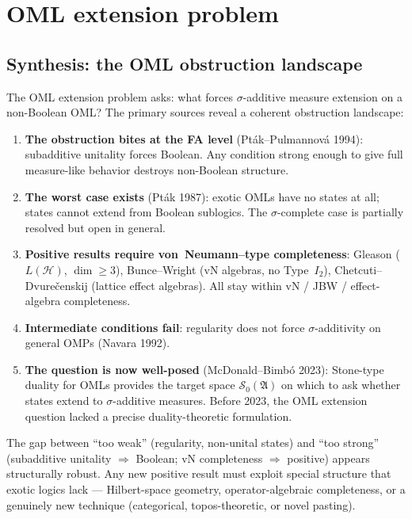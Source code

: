 \section{OML extension problem}

\subsection*{Synthesis: the OML obstruction landscape}

The OML extension problem asks: what forces $\sigma$-additive measure
extension on a non-Boolean OML?  The primary sources reveal a coherent
obstruction landscape:

\begin{enumerate}[nosep]
  \item \textbf{The obstruction bites at the FA level} (Pt\'{a}k--Pulmannov\'{a}
    1994): subadditive unitality forces Boolean.  Any condition strong
    enough to give full measure-like behavior destroys non-Boolean
    structure.
  \item \textbf{The worst case exists} (Pt\'{a}k 1987): exotic OMLs have
    no states at all; states cannot extend from Boolean sublogics.
    The $\sigma$-complete case is partially resolved but open in general.
  \item \textbf{Positive results require von~Neumann--type completeness}:
    Gleason ($L(\mathcal{H})$, $\dim \geq 3$), Bunce--Wright (vN
    algebras, no Type~$I_2$), Chetcuti--Dvure\v{c}enskij (lattice effect
    algebras).  All stay within vN / JBW / effect-algebra completeness.
  \item \textbf{Intermediate conditions fail}: regularity does not force
    $\sigma$-additivity on general OMPs (Navara 1992).
  \item \textbf{The question is now well-posed} (McDonald--Bimb\'{o} 2023):
    Stone-type duality for OMLs provides the target space
    $\mathcal{S}_0(\mathfrak{A})$ on which to ask whether states extend
    to $\sigma$-additive measures.  Before 2023, the OML extension
    question lacked a precise duality-theoretic formulation.
\end{enumerate}

\noindent
The gap between ``too weak'' (regularity, non-unital states) and
``too strong'' (subadditive unitality $\Rightarrow$ Boolean; vN
completeness $\Rightarrow$ positive) appears structurally robust.
Any new positive result must exploit special structure that exotic
logics lack --- Hilbert-space geometry, operator-algebraic completeness,
or a genuinely new technique (categorical, topos-theoretic, or novel
pasting).

